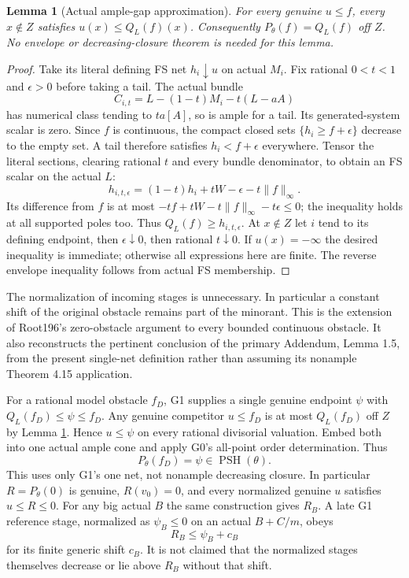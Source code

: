 \documentclass[10pt]{article}
\newtheorem{lemma}[theorem]{Lemma}
\newcommand{\PSH}{\operatorname{PSH}}
\begin{document}
\begin{lemma}[Actual ample-gap approximation]\label{sections}
For every genuine $u\leq f$, every $x\notin Z$ satisfies
$u(x)\leq Q_L(f)(x)$. Consequently $P_\theta(f)=Q_L(f)$ off $Z$.
No envelope or decreasing-closure theorem is needed for this lemma.
\end{lemma}
\begin{proof}
Take its literal defining FS net $h_i\downarrow u$ on actual $M_i$.
Fix rational $0<t<1$ and $\epsilon>0$ before taking a tail. The actual
bundle
\[
 C_{i,t}=L-(1-t)M_i-t(L-aA)
\]
has numerical class tending to $ta[A]$, so is ample for a tail. Its
generated-system scalar is zero. Since $f$ is continuous, the compact
closed sets $\{h_i\geq f+\epsilon\}$ decrease to the empty set. A tail
therefore satisfies $h_i<f+\epsilon$ everywhere. Tensor the literal
sections, clearing rational $t$ and every bundle denominator, to obtain
an FS scalar on the actual $L$:
\[
 h_{i,t,\epsilon}=(1-t)h_i+tW-\epsilon-t\|f\|_\infty.
\]
Its difference from $f$ is at most
$-t f+tW-t\|f\|_\infty-t\epsilon\leq0$; the inequality holds at
all supported poles too. Thus $Q_L(f)\geq h_{i,t,\epsilon}$.
At $x\notin Z$ let $i$ tend to its defining endpoint, then
$\epsilon\downarrow0$, then rational $t\downarrow0$. If $u(x)=-\infty$
the desired inequality is immediate; otherwise all expressions here are
finite. The reverse envelope inequality follows from actual FS membership.
\end{proof}

The normalization of incoming stages is unnecessary. In particular a
constant shift of the original obstacle remains part of the minorant.
This is the extension of Root196's zero-obstacle argument to every
bounded continuous obstacle. It also reconstructs the pertinent conclusion
of the primary Addendum, Lemma 1.5, from the present single-net definition
rather than assuming its nonample Theorem 4.15 application.

For a rational model obstacle $f_D$, G1 supplies a single genuine endpoint
$\psi$ with $Q_L(f_D)\leq\psi\leq f_D$. Any genuine competitor $u\leq f_D$
is at most $Q_L(f_D)$ off $Z$ by Lemma \ref{sections}. Hence $u\leq\psi$
on every rational divisorial valuation. Embed both into one actual ample
cone and apply G0's all-point order determination. Thus
\[
 P_\theta(f_D)=\psi\in\PSH(\theta).
\tag{3.1}
\]
This uses only G1's one net, not nonample decreasing closure. In particular
$R=P_\theta(0)$ is genuine, $R(v_0)=0$, and every normalized genuine $u$
satisfies $u\leq R\leq0$. For any big actual $B$ the same construction
gives $R_B$. A late G1 reference stage, normalized as $\psi_B\leq0$ on
an actual $B+C/m$, obeys
\[
 R_B\leq\psi_B+c_B
\tag{3.2}
\]
for its finite generic shift $c_B$. It is not claimed that the normalized
stages themselves decrease or lie above $R_B$ without that shift.
\end{document}
